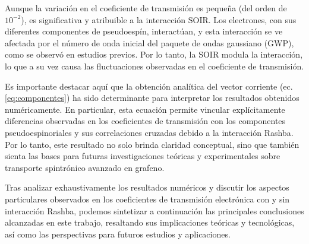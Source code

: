 Aunque la variación en el coeficiente de transmisión es pequeña (del orden de $10^{-2}$), es significativa y atribuible a la interacción SOIR. Los electrones, con sus diferentes componentes de pseudoespín, interactúan, y esta interacción se ve afectada por el número de onda inicial del paquete de ondas gaussiano (GWP), como se observó en estudios previos\cite{Serna2019}.
Por lo tanto, la SOIR modula la interacción, lo que a su vez causa las fluctuaciones observadas en el coeficiente de transmisión.

Es importante destacar aquí que la obtención analítica del vector corriente (ec. \ref{eq:componentes}) ha sido determinante para interpretar los resultados obtenidos numéricamente.
En particular, esta ecuación permite vincular explícitamente diferencias observadas en los coeficientes de transmisión con los componentes pseudoespinoriales y sus correlaciones cruzadas debido a la interacción Rashba.
Por lo tanto, este resultado no solo brinda claridad conceptual, sino que también sienta las bases para futuras investigaciones teóricas y experimentales sobre transporte spintrónico avanzado en grafeno.

Tras analizar exhaustivamente los resultados numéricos y discutir los aspectos particulares observados en los coeficientes de transmisión electrónica con y sin interacción Rashba, podemos sintetizar a continuación las principales conclusiones alcanzadas en este trabajo, resaltando sus implicaciones teóricas y tecnológicas, así como las perspectivas para futuros estudios y aplicaciones.
